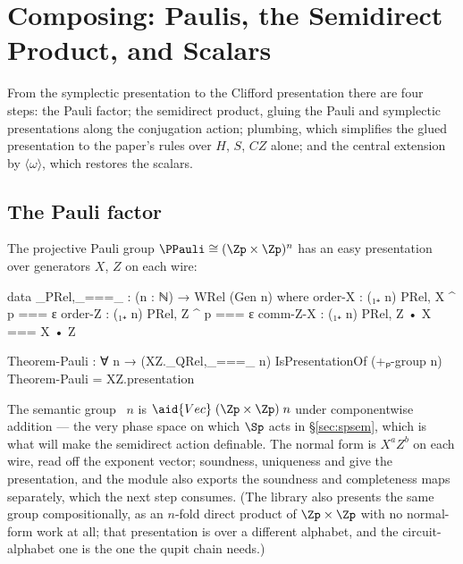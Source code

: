 \section{Composing: Paulis, the Semidirect Product, and Scalars}\label{sec:composing}

From the symplectic presentation to the Clifford presentation there are
four steps: the Pauli factor; the semidirect product, gluing the Pauli
and symplectic presentations along the conjugation action; plumbing,
which simplifies the glued presentation to the paper's rules over $H$,
$S$, $CZ$ alone; and the central extension by $\langle\omega\rangle$,
which restores the scalars.

\subsection{The Pauli factor}\label{sec:pauli}

The projective Pauli group $\PPauli \cong (\Zp \times \Zp)^n$ has an easy
presentation over generators $X$, $Z$ on each wire:

\begin{agdacode}
data _PRel,_===_ : (n : ℕ) → WRel (Gen n) where
  order-X   : (₁₊ n) PRel,  X ^ p === ε
  order-Z   : (₁₊ n) PRel,  Z ^ p === ε
  comm-Z-X  : (₁₊ n) PRel,  Z • X === X • Z

Theorem-Pauli : ∀ {n} → (XZ._QRel,_===_ n) IsPresentationOf (+ₚ-group n)
Theorem-Pauli = XZ.presentation
\end{agdacode}
\begin{center}
  \qquad
  \qquad
\end{center}

The semantic group ~$n$ is $\aid{Vec}\;(\Zp \times \Zp)\;n$
under componentwise addition --- the very phase space on which $\Sp$
acts in \S\ref{sec:spsem}, which is what will make the semidirect action
definable.  The normal form is $X^{a}Z^{b}$ on each wire, read off the
exponent vector; soundness, uniqueness and  give the
presentation, and the module also exports the soundness and completeness
maps separately, which the next step consumes.  (The library also
presents the same group compositionally, as an $n$-fold direct product
of $\Zp \times \Zp$ with no normal-form work at all; that presentation is
over a different alphabet, and the circuit-alphabet one is the one the
qupit chain needs.)

